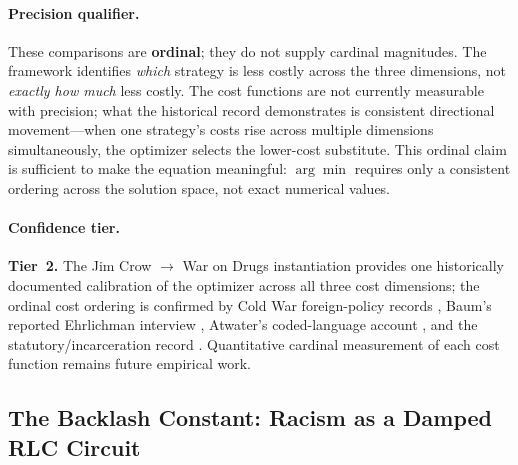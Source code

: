 \paragraph{Precision qualifier.}
These comparisons are \textbf{ordinal}; they do not supply cardinal magnitudes. The framework identifies \textit{which} strategy is less costly across the three dimensions, not \textit{exactly how much} less costly. The cost functions are not currently measurable with precision; what the historical record demonstrates is consistent directional movement---when one strategy's costs rise across multiple dimensions simultaneously, the optimizer selects the lower-cost substitute. This ordinal claim is sufficient to make the equation meaningful: $\arg\min$ requires only a consistent ordering across the solution space, not exact numerical values.

\paragraph{Confidence tier.}
\textbf{Tier~2.} The Jim Crow $\to$ War on Drugs instantiation provides one historically documented calibration of the optimizer across all three cost dimensions; the ordinal cost ordering is confirmed by Cold War foreign-policy records \cite{dudziak}, Baum's reported Ehrlichman interview \cite{baum}, Atwater's coded-language account \cite{atwater}, and the statutory/incarceration record \cite{caulkins_chandler_drug_incarceration, ussc_crack_retroactivity_2011}. Quantitative cardinal measurement of each cost function remains future empirical work.

\subsection{The Backlash Constant: Racism as a Damped RLC Circuit}

